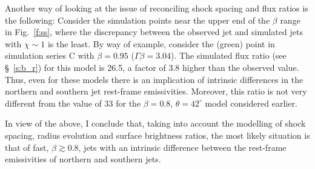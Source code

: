 Another way of looking at the issue of reconciling shock spacing and flux ratios is the following: Consider the simulation points near the upper end of the $\beta$ range in Fig.~\ref{f:ss}, where the discrepancy between the observed jet and simulated jets with $\chi \sim 1$ is the least. By way of example, consider the (green) point in simulation series C with $\beta=0.95$ ($\Gamma \beta = 3.04$). The simulated flux ratio (see \S~\ref{s:b_r}) for this model is 26.5, a factor of 3.8 higher than the observed value. Thus, even for these models there is an implication of intrinsic differences in the northern and southern jet rest-frame emissivities. Moreover, this ratio is not very different from the value of 33 for the $\beta =0.8$, $\theta = 42^\circ$ model considered earlier.

In view of the above, I conclude that, taking into account the modelling of shock spacing, radius evolution and surface brightness ratios, the most likely situation is that of fast, $\beta \gtrsim 0.8$, jets with an intrinsic difference between the rest-frame emissivities of northern and southern jets.

